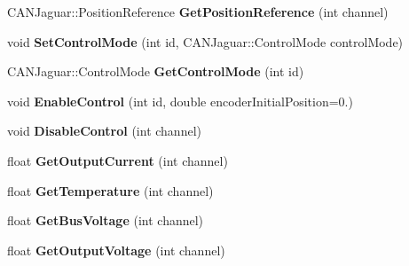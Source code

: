 \begin{DoxyCompactItemize}
\item 
\hypertarget{class_virtual_c_a_n_bus_controller_a9c5f8c692d22184e2793130ecf3a5b30}{
\-C\-A\-N\-Jaguar\-::\-Position\-Reference {\bfseries \-Get\-Position\-Reference} (int channel)}
\label{class_virtual_c_a_n_bus_controller_a9c5f8c692d22184e2793130ecf3a5b30}

\item 
\hypertarget{class_virtual_c_a_n_bus_controller_abe6d2102ff281b9e03a9480ee5ede760}{
void {\bfseries \-Set\-Control\-Mode} (int id, \-C\-A\-N\-Jaguar\-::\-Control\-Mode control\-Mode)}
\label{class_virtual_c_a_n_bus_controller_abe6d2102ff281b9e03a9480ee5ede760}

\item 
\hypertarget{class_virtual_c_a_n_bus_controller_a24df545c341c3fa8ec938ae36dee407e}{
\-C\-A\-N\-Jaguar\-::\-Control\-Mode {\bfseries \-Get\-Control\-Mode} (int id)}
\label{class_virtual_c_a_n_bus_controller_a24df545c341c3fa8ec938ae36dee407e}

\item 
\hypertarget{class_virtual_c_a_n_bus_controller_a88d72f7ae5df49cb8ec2f415b0a4ae51}{
void {\bfseries \-Enable\-Control} (int id, double encoder\-Initial\-Position=0.)}
\label{class_virtual_c_a_n_bus_controller_a88d72f7ae5df49cb8ec2f415b0a4ae51}

\item 
\hypertarget{class_virtual_c_a_n_bus_controller_aa37fec01687497005b07fcf95cc210a0}{
void {\bfseries \-Disable\-Control} (int channel)}
\label{class_virtual_c_a_n_bus_controller_aa37fec01687497005b07fcf95cc210a0}

\item 
\hypertarget{class_virtual_c_a_n_bus_controller_aa7c5537c1c3051f92f13043ce6afb555}{
float {\bfseries \-Get\-Output\-Current} (int channel)}
\label{class_virtual_c_a_n_bus_controller_aa7c5537c1c3051f92f13043ce6afb555}

\item 
\hypertarget{class_virtual_c_a_n_bus_controller_ad095faa9e62adef02b66935cc1b24bf7}{
float {\bfseries \-Get\-Temperature} (int channel)}
\label{class_virtual_c_a_n_bus_controller_ad095faa9e62adef02b66935cc1b24bf7}

\item 
\hypertarget{class_virtual_c_a_n_bus_controller_aada6ddfd6c08bb09f5631aeb7e72b621}{
float {\bfseries \-Get\-Bus\-Voltage} (int channel)}
\label{class_virtual_c_a_n_bus_controller_aada6ddfd6c08bb09f5631aeb7e72b621}

\item 
\hypertarget{class_virtual_c_a_n_bus_controller_a5c6f8eb9326ba49c767a35b4d8e7d9ee}{
float {\bfseries \-Get\-Output\-Voltage} (int channel)}
\label{class_virtual_c_a_n_bus_controller_a5c6f8eb9326ba49c767a35b4d8e7d9ee}


\end{DoxyCompactItemize}
